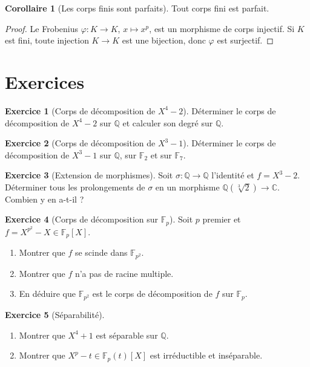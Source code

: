 \documentclass[12pt,a4paper,openany]{book}
\theoremstyle{definition}
\newtheorem{corollaire}{Corollaire}[chapter]
\newtheorem{exercice}{Exercice}[chapter]
\newcommand{\Q}{\mathbb{Q}}
\newcommand{\C}{\mathbb{C}}
\newcommand{\F}{\mathbb{F}}
\begin{document}
\begin{corollaire}[Les corps finis sont parfaits]\label{cor:finis-parfaits}
Tout corps fini est parfait.
\end{corollaire}

\begin{proof}
Le Frobenius $\varphi \colon K \to K$, $x \mapsto x^p$, est un morphisme
de corps injectif. Si $K$ est fini, toute injection $K \to K$ est une bijection,
donc $\varphi$ est surjectif.
\end{proof}

\section{Exercices}
\label{sec:exercices-chap9}

\begin{exercice}[Corps de décomposition de $X^4 - 2$]\label{exo:decomp-X4-2}
Déterminer le corps de décomposition de $X^4 - 2$ sur $\Q$ et calculer son
degré sur $\Q$.
\end{exercice}

\begin{exercice}[Corps de décomposition de $X^3 - 1$]\label{exo:decomp-X3-1}
Déterminer le corps de décomposition de $X^3 - 1$ sur $\Q$, sur $\F_2$ et
sur $\F_7$.
\end{exercice}

\begin{exercice}[Extension de morphismes]\label{exo:extension-morphismes}
Soit $\sigma \colon \Q \to \Q$ l'identité et $f = X^3 - 2$. Déterminer tous
les prolongements de $\sigma$ en un morphisme $\Q(\sqrt[3]{2}) \to \C$.
Combien y en a-t-il ?
\end{exercice}

\begin{exercice}[Corps de décomposition sur $\F_p$]\label{exo:decomp-Fp}
Soit $p$ premier et $f = X^{p^2} - X \in \F_p[X]$.
\begin{enumerate}[label=(\alph*)]
  \item Montrer que $f$ se scinde dans $\F_{p^2}$.
  \item Montrer que $f$ n'a pas de racine multiple.
  \item En déduire que $\F_{p^2}$ est le corps de décomposition de $f$ sur
    $\F_p$.
\end{enumerate}
\end{exercice}

\begin{exercice}[Séparabilité]\label{exo:separabilite}
\begin{enumerate}[label=(\alph*)]
  \item Montrer que $X^4 + 1$ est séparable sur $\Q$.
  \item Montrer que $X^p - t \in \F_p(t)[X]$ est irréductible et inséparable.
\end{enumerate}
\end{exercice}
\end{document}
